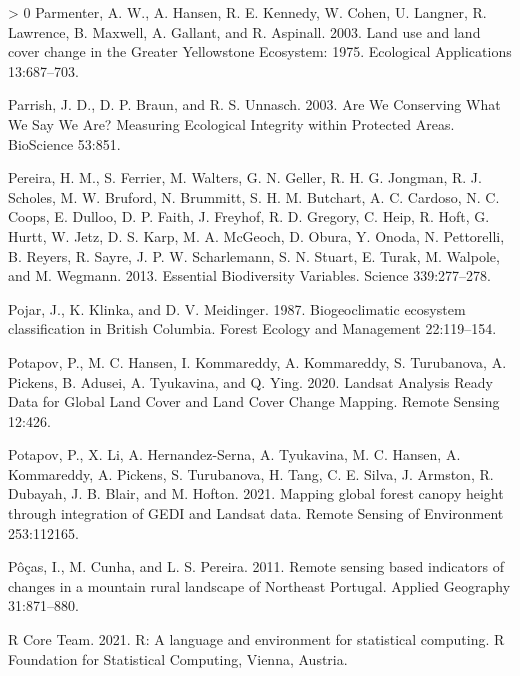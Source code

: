 \documentclass[10pt,oneside]{article}
\newlength{\cslhangindent}
\newenvironment{CSLReferences}[3] %
 {%
  \setlength{\parindent}{0pt}
  \ifodd #1 \everypar{\setlength{\hangindent}{\cslhangindent}}\ignorespaces\fi
  \ifnum #2 > 0
  \setlength{\parskip}{#2\baselineskip}
  \fi
 }%
 {}
\begin{document}
\begin{CSLReferences}{1}{0}
\leavevmode\hypertarget{ref-parmenterLandUseLand2003}{}%
Parmenter, A. W., A. Hansen, R. E. Kennedy, W. Cohen, U. Langner, R.
Lawrence, B. Maxwell, A. Gallant, and R. Aspinall. 2003. Land use and
land cover change in the Greater Yellowstone Ecosystem: 1975. Ecological
Applications 13:687--703.

\leavevmode\hypertarget{ref-parrishAreWeConserving2003}{}%
Parrish, J. D., D. P. Braun, and R. S. Unnasch. 2003. Are We Conserving
What We Say We Are? Measuring Ecological Integrity within Protected
Areas. BioScience 53:851.

\leavevmode\hypertarget{ref-pereira2013}{}%
Pereira, H. M., S. Ferrier, M. Walters, G. N. Geller, R. H. G. Jongman,
R. J. Scholes, M. W. Bruford, N. Brummitt, S. H. M. Butchart, A. C.
Cardoso, N. C. Coops, E. Dulloo, D. P. Faith, J. Freyhof, R. D. Gregory,
C. Heip, R. Hoft, G. Hurtt, W. Jetz, D. S. Karp, M. A. McGeoch, D.
Obura, Y. Onoda, N. Pettorelli, B. Reyers, R. Sayre, J. P. W.
Scharlemann, S. N. Stuart, E. Turak, M. Walpole, and M. Wegmann. 2013.
Essential Biodiversity Variables. Science 339:277--278.

\leavevmode\hypertarget{ref-pojarBiogeoclimaticEcosystemClassification1987}{}%
Pojar, J., K. Klinka, and D. V. Meidinger. 1987. Biogeoclimatic
ecosystem classification in British Columbia. Forest Ecology and
Management 22:119--154.

\leavevmode\hypertarget{ref-potapovLandsatAnalysisReady2020}{}%
Potapov, P., M. C. Hansen, I. Kommareddy, A. Kommareddy, S. Turubanova,
A. Pickens, B. Adusei, A. Tyukavina, and Q. Ying. 2020. Landsat Analysis
Ready Data for Global Land Cover and Land Cover Change Mapping. Remote
Sensing 12:426.

\leavevmode\hypertarget{ref-potapovMappingGlobalForest2021}{}%
Potapov, P., X. Li, A. Hernandez-Serna, A. Tyukavina, M. C. Hansen, A.
Kommareddy, A. Pickens, S. Turubanova, H. Tang, C. E. Silva, J. Armston,
R. Dubayah, J. B. Blair, and M. Hofton. 2021. Mapping global forest
canopy height through integration of GEDI and Landsat data. Remote
Sensing of Environment 253:112165.

\leavevmode\hypertarget{ref-puxf4uxe7as2011}{}%
Pôças, I., M. Cunha, and L. S. Pereira. 2011. Remote sensing based
indicators of changes in a mountain rural landscape of Northeast
Portugal. Applied Geography 31:871--880.

\leavevmode\hypertarget{ref-R-base}{}%
R Core Team. 2021. R: A language and environment for statistical
computing. R Foundation for Statistical Computing, Vienna, Austria.


\end{CSLReferences}
\end{document}

